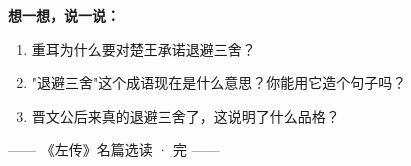 \documentclass[a4paper,12pt]{ctexart}
\begin{document}
\vspace{0.3cm}
{\large\textcolor{orange!80!black}{\textbf{想一想，说一说：}}}
\begin{enumerate}
  \item 重耳为什么要对楚王承诺退避三舍？
  \item "退避三舍"这个成语现在是什么意思？你能用它造个句子吗？
  \item 晋文公后来真的退避三舍了，这说明了什么品格？
\end{enumerate}

\vspace{0.5cm}
\begin{center}
\textcolor{blue!70!black}{\large —— 《左传》名篇选读 · 完 ——}
\end{center}
\end{document}
